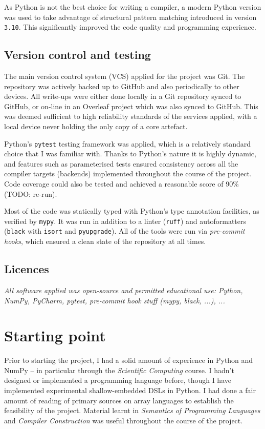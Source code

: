 As Python is not the best choice for writing a compiler, a modern Python version was used to take advantage of structural pattern matching introduced in version \texttt{3.10}. This significantly improved the code quality and programming experience. 

\subsection{Version control and testing}

The main version control system (VCS) applied for the project was Git. The repository was actively backed up to GitHub and also periodically to other devices. All write-ups were either done locally in a Git repository synced to GitHub, or on-line in an Overleaf project which was also synced to GitHub. This was deemed sufficient to high reliability standards of the services applied, with a local device never holding the only copy of a core artefact. 

Python's \texttt{pytest} testing framework was applied, which is a relatively standard choice that I was familiar with. Thanks to Python's nature it is highly dynamic, and features such as parameterised tests ensured consistency across all the compiler targets (backends) implemented throughout the course of the project. Code coverage could also be tested and achieved a reasonable score of 90\% (TODO: re-run).

Most of the code was statically typed with Python's type annotation facilities, as verified by \texttt{mypy}. It was run in addition to a linter (\texttt{ruff}) and autoformatters (\texttt{black} with \texttt{isort} and \texttt{pyupgrade}). All of the tools were run via \textit{pre-commit hooks}, which ensured a clean state of the repository at all times.

\subsection{Licences}

\textit{All software applied was open-source and permitted educational use: Python, NumPy, PyCharm, pytest, pre-commit hook stuff (mypy, black, ...), ...}

\section{Starting point}

Prior to starting the project, I had a solid amount of experience in Python and NumPy -- in particular through the \textit{Scientific Computing} course. I hadn't designed or implemented a programming language before, though I have implemented experimental shallow-embedded DSLs in Python. I had done a fair amount of reading of primary sources on array languages to establish the feasibility of the project. Material learnt in \textit{Semantics of Programming Languages} and \textit{Compiler Construction} was useful throughout the course of the project.

